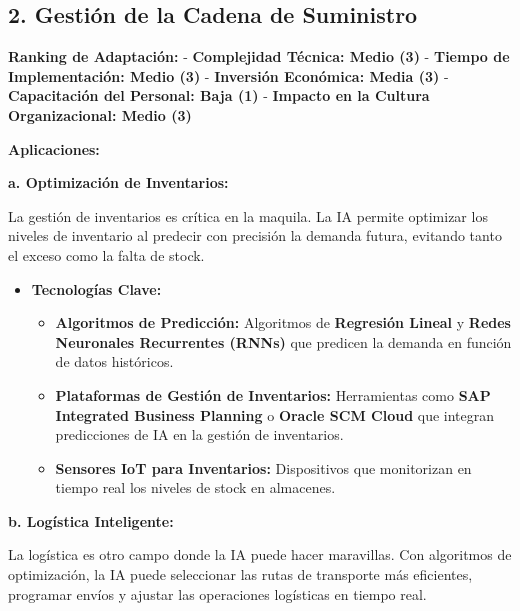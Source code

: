 \documentclass[
  letterpaper,
]{book}
\providecommand{\tightlist}{%
  \setlength{\itemsep}{0pt}\setlength{\parskip}{0pt}}\usepackage{longtable,booktabs,array}
\begin{document}
\subsection{\texorpdfstring{2. \textbf{Gestión de la Cadena de
Suministro}}{2. Gestión de la Cadena de Suministro}}\label{gestiuxf3n-de-la-cadena-de-suministro}

\textbf{Ranking de Adaptación:} - \textbf{Complejidad Técnica: Medio
(3)} - \textbf{Tiempo de Implementación: Medio (3)} - \textbf{Inversión
Económica: Media (3)} - \textbf{Capacitación del Personal: Baja (1)} -
\textbf{Impacto en la Cultura Organizacional: Medio (3)}

\textbf{Aplicaciones:}

\textbf{a. Optimización de Inventarios:}

La gestión de inventarios es crítica en la maquila. La IA permite
optimizar los niveles de inventario al predecir con precisión la demanda
futura, evitando tanto el exceso como la falta de stock.

\begin{itemize}
\tightlist
\item
  \textbf{Tecnologías Clave:}

  \begin{itemize}
  \tightlist
  \item
    \textbf{Algoritmos de Predicción:} Algoritmos de \textbf{Regresión
    Lineal} y \textbf{Redes Neuronales Recurrentes (RNNs)} que predicen
    la demanda en función de datos históricos.
  \item
    \textbf{Plataformas de Gestión de Inventarios:} Herramientas como
    \textbf{SAP Integrated Business Planning} o \textbf{Oracle SCM
    Cloud} que integran predicciones de IA en la gestión de inventarios.
  \item
    \textbf{Sensores IoT para Inventarios:} Dispositivos que monitorizan
    en tiempo real los niveles de stock en almacenes.
  \end{itemize}
\end{itemize}

\textbf{b. Logística Inteligente:}

La logística es otro campo donde la IA puede hacer maravillas. Con
algoritmos de optimización, la IA puede seleccionar las rutas de
transporte más eficientes, programar envíos y ajustar las operaciones
logísticas en tiempo real.
\end{document}
